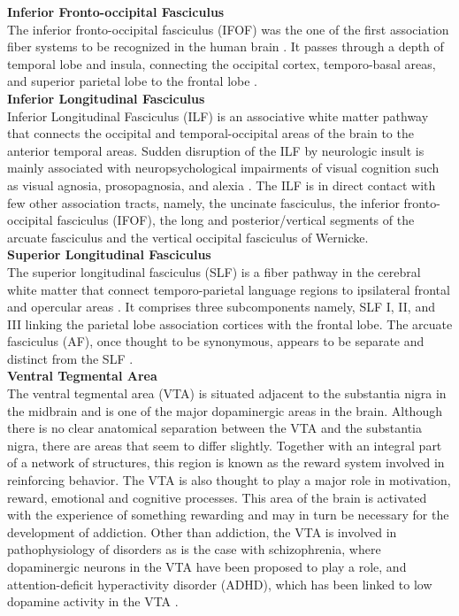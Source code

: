\documentclass[../structure.tex]{subfiles}
\begin{document}
	
		\textbf{Inferior Fronto-occipital Fasciculus} \\		
		The inferior fronto-occipital fasciculus (IFOF)  was the one of the first association fiber systems to be recognized in the human brain \cite{Wu2016}. It passes through a depth of temporal lobe and insula, connecting the occipital cortex, temporo-basal areas, and superior parietal lobe to the frontal lobe \cite{PDD2015} . \\

				
		\textbf{Inferior Longitudinal Fasciculus}\\		
		Inferior Longitudinal Fasciculus (ILF) is an associative white matter pathway that connects the occipital and temporal-occipital areas of the brain to the anterior temporal areas.  Sudden disruption of the ILF by neurologic insult is mainly associated with  neuropsychological impairments of visual cognition such as visual agnosia, prosopagnosia, and alexia \cite{Herbet2018}. The ILF is in direct contact with few other association tracts, namely, the uncinate fasciculus, the inferior fronto-occipital fasciculus (IFOF), the long and posterior/vertical segments of the arcuate fasciculus and the vertical occipital fasciculus of Wernicke.\\

		

		\textbf{Superior Longitudinal Fasciculus}\\			
		The superior longitudinal fasciculus (SLF) is a fiber pathway in the cerebral white matter that connect temporo-parietal language regions to ipsilateral frontal and opercular areas \cite{Madhavan2014}. It comprises three subcomponents namely, SLF I, II, and III linking the parietal lobe association cortices with the frontal lobe. The arcuate fasciculus (AF), once thought to be synonymous, appears to be separate and distinct from the SLF \cite{Schmahmann2006}.\\
		
		
		\textbf{Ventral Tegmental Area}\\
		The ventral tegmental area (VTA) is situated adjacent to the substantia nigra in the midbrain and is one of the major dopaminergic areas in the brain. Although there is no clear anatomical separation between the VTA and the substantia nigra, there are areas that seem to differ slightly. Together with an integral part of a network of structures, this region is known as the reward system involved in reinforcing behavior. The VTA is also thought to play a major role in motivation, reward, emotional and cognitive processes. This area of the brain is activated with the experience of something rewarding and may in turn be necessary for the development of addiction. Other than addiction, the VTA is involved in pathophysiology of disorders as is the case with schizophrenia, where dopaminergic neurons in the VTA have been proposed to play a role, and attention-deficit hyperactivity disorder (ADHD), which has been linked to low dopamine activity in the VTA \cite{Kalivas1993}.\\
	
\end{document}

